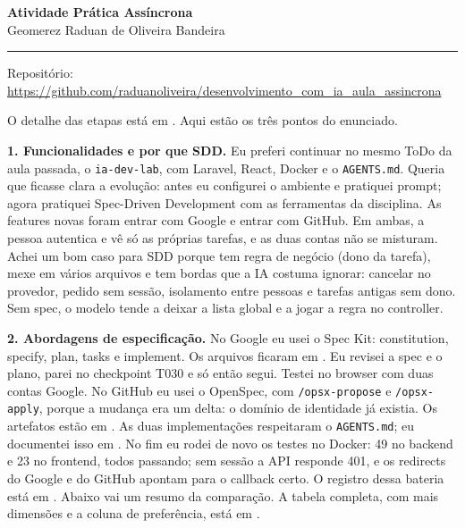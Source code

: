 \documentclass[12pt,a4paper]{article}
\begin{document}
\begin{center}
{\bfseries Atividade Prática Assíncrona}\\
Geomerez Raduan de Oliveira Bandeira
\end{center}

\vspace{0.1em}
\hrule
\vspace{0.35em}

Repositório: \url{https://github.com/raduanoliveira/desenvolvimento_com_ia_aula_assincrona}

O detalhe das etapas está em . Aqui estão os três pontos do enunciado.

\textbf{1. Funcionalidades e por que SDD.} Eu preferi continuar no mesmo ToDo da aula passada, o \texttt{ia-dev-lab}, com Laravel, React, Docker e o \texttt{AGENTS.md}. Queria que ficasse clara a evolução: antes eu configurei o ambiente e pratiquei prompt; agora pratiquei Spec-Driven Development com as ferramentas da disciplina. As features novas foram entrar com Google e entrar com GitHub. Em ambas, a pessoa autentica e vê só as próprias tarefas, e as duas contas não se misturam. Achei um bom caso para SDD porque tem regra de negócio (dono da tarefa), mexe em vários arquivos e tem bordas que a IA costuma ignorar: cancelar no provedor, pedido sem sessão, isolamento entre pessoas e tarefas antigas sem dono. Sem spec, o modelo tende a deixar a lista global e a jogar a regra no controller.

\textbf{2. Abordagens de especificação.} No Google eu usei o Spec Kit: constitution, specify, plan, tasks e implement. Os arquivos ficaram em . Eu revisei a spec e o plano, parei no checkpoint T030 e só então segui. Testei no browser com duas contas Google. No GitHub eu usei o OpenSpec, com \texttt{/opsx-propose} e \texttt{/opsx-apply}, porque a mudança era um delta: o domínio de identidade já existia. Os artefatos estão em . As duas implementações respeitaram o \texttt{AGENTS.md}; eu documentei isso em . No fim eu rodei de novo os testes no Docker: 49 no backend e 23 no frontend, todos passando; sem sessão a API responde 401, e os redirects do Google e do GitHub apontam para o callback certo. O registro dessa bateria está em . Abaixo vai um resumo da comparação. A tabela completa, com mais dimensões e a coluna de preferência, está em .
\end{document}
